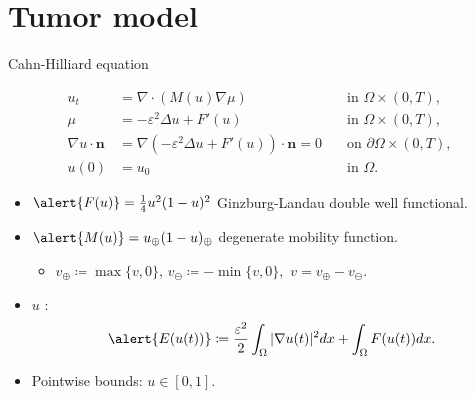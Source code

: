 
\begin{frame}[t,plain]
\titlepage
\end{frame}


\section{Tumor model}

\begin{frame}{Cahn-Hilliard equation}
	\begin{block}{}
		\vspace*{-0.2cm}
		\begin{equation*}
			\begin{aligned}
				u_t&= \nabla\cdot \left(M(u)\nabla\mu\right)\quad&\text{in }\Omega\times(0,T),\\
				\mu&=-\varepsilon^2\Delta u+F'(u)\quad&\text{in }\Omega\times(0,T),\\
				\nabla u\cdot \mathbf{n}&=\nabla(-\varepsilon^2\Delta u+F'(u))\cdot\mathbf{n}=0\quad&\text{on }\partial\Omega\times(0,T),\\
				u(0)&=u_0\quad&\text{in }\Omega.
			\end{aligned}
		\end{equation*}
	\end{block}
	\begin{itemize}
		\item $\alert{F(u)}=\frac{1}{4}u^2(1-u)^2$ Ginzburg-Landau double well functional.
		\item $\alert{M(u)}=u_\oplus(1-u)_\oplus$ degenerate mobility function.
		\begin{itemize}
			\item $v_\oplus \coloneqq\max\{v,0\}$,\quad
			$v_\ominus \coloneqq-\min\{v,0\},$\quad
			$v=v_\oplus  - v_\ominus$.
		\end{itemize}
		\item $u$ :
		$$\alert{E(u(t))}\coloneqq\frac{\varepsilon^2}{2}\int_\Omega|\nabla u(t)|^2dx+\int_\Omega F(u(t))dx.$$
		\item Pointwise bounds: $u\in[0,1]$. 
	\end{itemize}
\end{frame}

